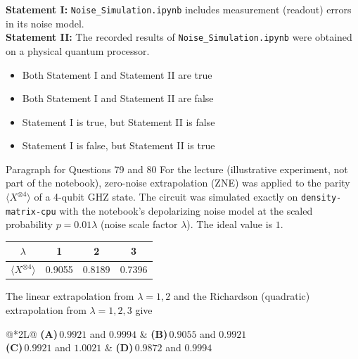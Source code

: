 \documentclass[11pt,a4paper]{article}
\newcommand{\optlabel}[1]{\textbf{(#1)}}
\newenvironment{qitem}[1]{\begin{list}{}{\setlength{\leftmargin}{3.3em}\setlength{\labelwidth}{3.1em}%
  \setlength{\labelsep}{0.2em}\setlength{\topsep}{3pt}\setlength{\parsep}{3pt}}\item[\textbf{Q.#1}\hfill]}{\end{list}}
\newcommand{\qsep}{\par\vspace{2pt}{\color{black!15}\hrule}\vspace{4pt}}
\begin{document}
\begin{qitem}{78}
\textbf{Statement I:} \texttt{Noise\_Simulation.ipynb} includes measurement (readout) errors in its noise model.\\[1mm]
\textbf{Statement II:} The recorded results of \texttt{Noise\_Simulation.ipynb} were obtained on a physical quantum processor.
\begin{itemize}[leftmargin=2.6em, labelsep=0.4em, itemsep=2pt, topsep=3pt]
\item[\optlabel{A}] Both Statement I and Statement II are true
\item[\optlabel{B}] Both Statement I and Statement II are false
\item[\optlabel{C}] Statement I is true, but Statement II is false
\item[\optlabel{D}] Statement I is false, but Statement II is true
\end{itemize}
\end{qitem}
\qsep

\begin{passagebox}{Paragraph for Questions 79 and 80}
For the lecture (illustrative experiment, not part of the notebook), zero-noise extrapolation (ZNE) was applied to the parity
$\langle X^{\otimes4}\rangle$ of a 4-qubit GHZ state. The circuit was simulated exactly on \texttt{density-matrix-cpu} with the notebook's
depolarizing noise model at the scaled probability $p = 0.01\lambda$ (noise scale factor $\lambda$). The ideal value is $1$.
\begin{center}\small
\begin{tabular}{cccc}\toprule $\lambda$ & 1 & 2 & 3\\ \midrule $\langle X^{\otimes4}\rangle$ & 0.9055 & 0.8189 & 0.7396\\ \bottomrule\end{tabular}
\end{center}
\end{passagebox}
\begin{qitem}{79}
The linear extrapolation from $\lambda = 1, 2$ and the Richardson (quadratic) extrapolation from $\lambda = 1, 2, 3$ give
\par\smallskip\noindent\begin{tabularx}{\linewidth}{@{}*{2}{L}@{}}
\optlabel{A}\,$0.9921$ and $0.9994$ & \optlabel{B}\,$0.9055$ and $0.9921$ \\[3pt]
\optlabel{C}\,$0.9921$ and $1.0021$ & \optlabel{D}\,$0.9872$ and $0.9994$
\end{tabularx}
\end{qitem}
\qsep
\end{document}
